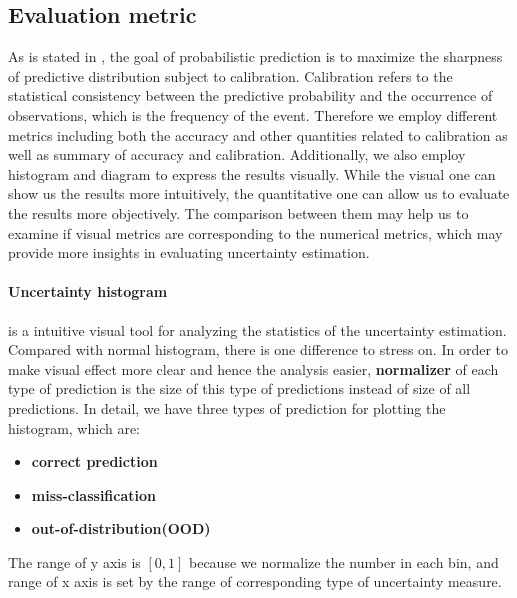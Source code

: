 \subsection{Evaluation metric}
As is stated in \cite{gneiting2007probabilistic}, the goal of probabilistic prediction is to maximize the sharpness of predictive distribution subject to calibration. Calibration refers to the statistical consistency between the predictive probability and the occurrence of observations, which is the frequency of the event. Therefore we employ different metrics including both the accuracy and other quantities related to calibration as well as summary of accuracy and calibration. Additionally, we also employ histogram and diagram to express the results visually. While the visual one can show us the results more intuitively, the quantitative one can allow us to evaluate the results more objectively. The comparison between them may help us to examine if visual metrics are corresponding to the numerical metrics, which may provide more insights in evaluating uncertainty estimation. 

\paragraph{Uncertainty histogram} is a intuitive visual tool for analyzing the statistics of the uncertainty estimation. Compared with normal histogram, there is one difference to stress on. In order to make visual effect more clear and hence the analysis easier, \textbf{normalizer} of each type of prediction is the size of this type of predictions instead of size of all predictions. In detail, we have three types of prediction for plotting the histogram, which are:
 \begin{itemize}
 	\item \textbf{correct prediction}
 	\item \textbf{miss-classification}
 	\item \textbf{out-of-distribution(OOD)}
 \end{itemize}The range of y axis is $[0,1]$ because we normalize the number in each bin, and range of x axis is set by the range of corresponding type of uncertainty measure.

